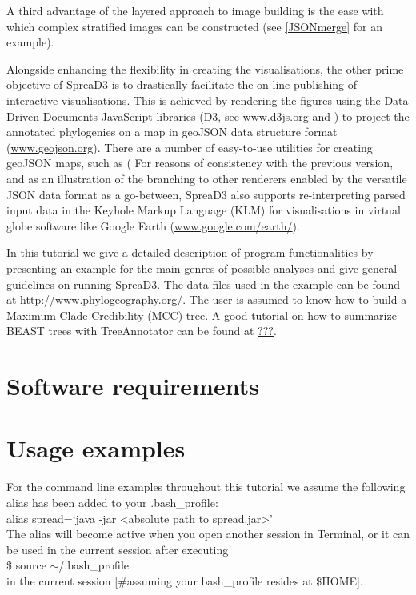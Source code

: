 \documentclass[english]{paper}
\begin{document}
A third advantage of the layered approach to image building is the ease with which complex stratified images can be constructed (see \ref{JSONmerge} for an example). 
\par
Alongside enhancing the flexibility in creating the visualisations, the other prime objective of SpreaD3 is to drastically facilitate the on-line publishing of interactive visualisations.
This is achieved by rendering the figures using the Data Driven Documents JavaScript libraries (D3, see \url{www.d3js.org} and \citet{Bostock:2011aa}) to project the annotated phylogenies on a map in geoJSON data structure format (\url{www.geojson.org}).
There are a number of easy-to-use utilities for creating geoJSON maps, such as (
For reasons of consistency with the previous version, and as an illustration of the branching to other renderers enabled by the versatile JSON data format as a go-between, SpreaD3 also supports re-interpreting parsed input data in the Keyhole Markup Language (KLM) for visualisations in virtual globe software like Google Earth (\url{www.google.com/earth/}). 
\par
In this tutorial we give a detailed description of program functionalities by presenting an example for the main genres of possible analyses and give general guidelines on running SpreaD3. 
The data files used in the example can be found at \url{http://www.phylogeography.org/}.
The user is assumed to know how to build a Maximum Clade Credibility (MCC) tree. 
A good tutorial on how to summarize BEAST trees with TreeAnnotator can be found at \url{???}.

\section{Software requirements}

\section{Usage examples}
% 
% 
For the command line examples throughout this tutorial we assume the following alias has been added to your .bash\_profile:
\\
alias spread=`java -jar <absolute path to spread.jar>' 
\\
The alias will become active when you open another session in Terminal, or it can be used in the current session after executing
\\
\$ source $\sim$/.bash\_profile
\\
in the current session  [\#assuming your bash\_profile resides at \$HOME]. 
\end{document}
